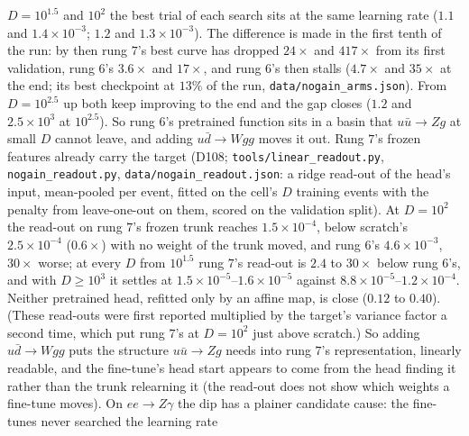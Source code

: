 \documentclass[11pt]{article}
\newcommand{\code}[1]{\texttt{#1}}
\begin{document}
$D=10^{1.5}$ and $10^2$ the best trial of each search sits at the same learning rate ($1.1$ and $1.4\times10^{-3}$; $1.2$ and
$1.3\times10^{-3}$). The difference is made in the first tenth of the run: by then rung $7$'s best curve has dropped
$24\times$ and $417\times$ from its first validation, rung $6$'s $3.6\times$ and $17\times$, and rung $6$'s then stalls
($4.7\times$ and $35\times$ at the end; its best checkpoint at $13\%$ of the run, \code{data/nogain\_arms.json}). From
$D=10^{2.5}$ up both keep improving to the end and the gap closes ($1.2$ and $2.5\times10^3$ at $10^{2.5}$). So rung $6$'s
pretrained function sits in a basin that $u\bar u\to Zg$ at small $D$ cannot leave, and adding $u\bar d\to Wgg$ moves it out.
Rung $7$'s frozen features already carry the target (D108; \code{tools/linear\_readout.py}, \code{nogain\_readout.py},
\code{data/nogain\_readout.json}: a ridge read-out of the head's input, mean-pooled per event, fitted on the cell's $D$
training events with the penalty from leave-one-out on them, scored on the validation split). At $D=10^2$ the read-out
on rung $7$'s frozen trunk reaches $1.5\times10^{-4}$, below scratch's $2.5\times10^{-4}$ ($0.6\times$) with no weight
of the trunk moved, and rung $6$'s $4.6\times10^{-3}$, $30\times$ worse; at every $D$ from $10^{1.5}$ rung $7$'s read-out is $2.4$ to
$30\times$ below rung $6$'s, and with $D\ge10^{3}$ it settles at $1.5\times10^{-5}$--$1.6\times10^{-5}$ against $8.8\times10^{-5}$--$1.2\times10^{-4}$. Neither
pretrained head, refitted only by an affine map, is close ($0.12$ to $0.40$). (These read-outs were first reported
multiplied by the target's variance factor a second time, which put rung $7$'s at $D=10^2$ just above scratch.)
So adding $u\bar d\to Wgg$ puts the
structure $u\bar u\to Zg$ needs into rung $7$'s representation, linearly readable, and the fine-tune's head start
appears to come from the head finding it rather than the trunk relearning it (the read-out does not show which
weights a fine-tune moves).
On $ee\to Z\gamma$ the dip has a plainer candidate cause: the fine-tunes never searched the learning rate
\end{document}
